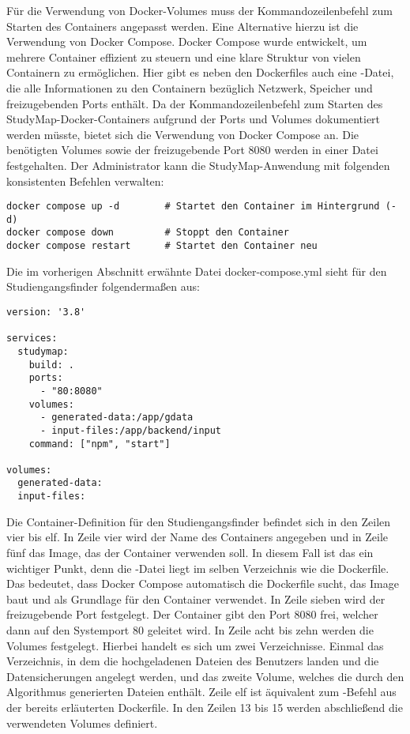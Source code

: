 Für die Verwendung von Docker-Volumes muss der Kommandozeilenbefehl zum Starten des Containers angepasst werden. Eine Alternative hierzu ist die Verwendung von Docker Compose. Docker Compose wurde entwickelt, um mehrere Container effizient zu steuern und eine klare Struktur von vielen Containern zu ermöglichen. Hier gibt es neben den Dockerfiles auch eine -Datei, die alle Informationen zu den Containern bezüglich Netzwerk, Speicher und freizugebenden Ports enthält. Da der Kommandozeilenbefehl zum Starten des StudyMap-Docker-Containers aufgrund der Ports und Volumes dokumentiert werden müsste, bietet sich die Verwendung von Docker Compose an. Die benötigten Volumes sowie der freizugebende Port 8080 werden in einer Datei festgehalten. \parencite{docker_inc_docker_0000} Der Administrator kann die StudyMap-Anwendung mit folgenden konsistenten Befehlen verwalten:

\noindent
\begin{minipage}{\linewidth}
\begin{lstlisting}[style=Python]
docker compose up -d        # Startet den Container im Hintergrund (-d)
docker compose down         # Stoppt den Container
docker compose restart      # Startet den Container neu
\end{lstlisting}
\end{minipage}

Die im vorherigen Abschnitt erwähnte Datei docker-compose.yml sieht für den Studiengangsfinder folgendermaßen aus:
\begin{lstlisting}[style=Python]
version: '3.8'

services:
  studymap:
    build: .
    ports:
      - "80:8080"
    volumes:
      - generated-data:/app/gdata
      - input-files:/app/backend/input
    command: ["npm", "start"]

volumes:
  generated-data:
  input-files:
\end{lstlisting}

Die Container-Definition für den Studiengangsfinder befindet sich in den Zeilen vier bis elf. In Zeile vier wird der Name des Containers angegeben und in Zeile fünf das Image, das der Container verwenden soll. In diesem Fall ist das ein wichtiger Punkt, denn die -Datei liegt im selben Verzeichnis wie die Dockerfile. Das bedeutet, dass Docker Compose automatisch die Dockerfile sucht, das Image baut und als Grundlage für den Container verwendet. In Zeile sieben wird der freizugebende Port festgelegt. Der Container gibt den Port 8080 frei, welcher dann auf den Systemport 80 geleitet wird. In Zeile acht bis zehn werden die Volumes festgelegt. Hierbei handelt es sich um zwei Verzeichnisse. Einmal das Verzeichnis, in dem die hochgeladenen Dateien des Benutzers landen und die Datensicherungen angelegt werden, und das zweite Volume, welches die durch den Algorithmus generierten Dateien enthält. Zeile elf ist äquivalent zum -Befehl aus der bereits erläuterten Dockerfile. In den Zeilen 13 bis 15 werden abschließend die verwendeten Volumes definiert.

